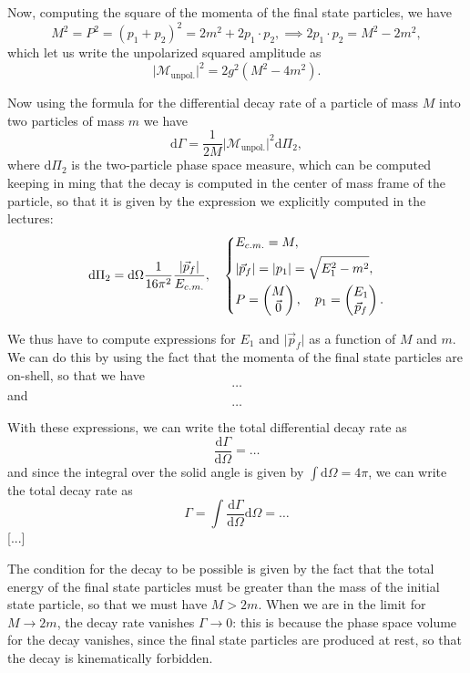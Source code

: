 Now, computing the square of the momenta of the final state particles, we have
\[
    M^2 = P^2 = (p_1 + p_2)^2 = 2m^2 + 2 p_1 \cdot p_2, \implies 2 p_1 \cdot p_2 = M^2 - 2m^2,
\]
which let us write the unpolarized squared amplitude as
\[
    \vert \mathcal{M}_{\text{unpol.}} \vert^2 = 2 g^2 (M^2 - 4 m^2).
\]

Now using the formula for the differential decay rate of a particle of mass \(M\) into two particles of mass \(m\) we have
\[
    \mathrm{d} \Gamma = \frac{1}{2M} \vert \mathcal{M}_{\text{unpol.}} \vert^2 \mathrm{d} \Pi_2,
\]
where \(\mathrm{d} \Pi_2\) is the two-particle phase space measure, which can be computed keeping in ming that the decay is computed in the center of mass frame of the particle, so that it is given by the expression we explicitly computed in the lectures:
\[
    \mathrm{d} \Pi_2 = \mathrm{d} \Omega \frac{1}{16 \pi^2} \frac{\vert \vec{p}_f \vert}{E_{c.m.}}, \quad \begin{dcases}
        E_{c.m.} = M,                                                 \\
        \vert \vec{p}_f \vert = \vert p_1 \vert = \sqrt{E_1^2 - m^2}, \\
        P = \begin{pmatrix}
                M \\
                \vec{0}
            \end{pmatrix}, \quad p_1 = \begin{pmatrix}
                                           E_1 \\
                                           \vec{p}_f
                                       \end{pmatrix}.
    \end{dcases}
\]

We thus have to compute expressions for \(E_1\) and \(\vert \vec{p}_f \vert\) as a function of \(M\) and \(m\). We can do this by using the fact that the momenta of the final state particles are on-shell, so that we have
\[
    \dots
\]
and
\[
    \dots
\]

With these expressions, we can write the total differential decay rate as
\[
    \frac{\mathrm{d} \Gamma}{\mathrm{d} \Omega} = \dots
\]
and since the integral over the solid angle is given by \(\int \mathrm{d} \Omega = 4 \pi\), we can write the total decay rate as
\[
    \Gamma = \int \frac{\mathrm{d} \Gamma}{\mathrm{d} \Omega} \mathrm{d} \Omega = \dots
\]
[...]
\begin{remark}
    The condition for the decay to be possible is given by the fact that the total energy of the final state particles must be greater than the mass of the initial state particle, so that we must have \(M > 2m\). When we are in the limit for \(M \to 2m\), the decay rate vanishes \(\Gamma \to 0\): this is because the phase space volume for the decay vanishes, since the final state particles are produced at rest, so that the decay is kinematically forbidden.
\end{remark}


